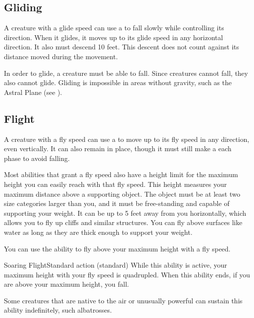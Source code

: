   \subsection{Gliding}\label{Gliding}
    A creature with a glide speed can use a  to fall slowly while controlling its direction.
    When it glides, it moves up to its glide speed in any horizontal direction.
    It also must descend 10 feet.
    This descent does not count against its distance moved during the movement.

    In order to glide, a creature must be able to fall.
    Since  creatures cannot fall, they also cannot glide.
    Gliding is impossible in areas without gravity, such as the Astral Plane (see ).

  \subsection{Flight}\label{Flight}
    A creature with a fly speed can use a  to move up to its fly speed in any direction, even vertically.
    It can also remain in place, though it must still make a  each phase to avoid falling.

     Most abilities that grant a fly speed also have a height limit for the maximum height you can easily reach with that fly speed.
    This height measures your maximum distance above a supporting object.
    The object must be at least two size categories larger than you, and it must be free-standing and capable of supporting your weight.
    It can be up to 5 feet away from you horizontally, which allows you to fly up cliffs and similar structures.
    You can fly above surfaces like water as long as they are thick enough to support your weight.

    You can use the  ability to fly above your maximum height with a fly speed.

    \begin{sustainability}{Soaring Flight}{Standard action}
      \abilitytags \atSustain (standard)
      \rankline
      While this ability is active, your maximum height with your fly speed is quadrupled.
      When this ability ends, if you are above your maximum height, you fall.

      Some creatures that are native to the air or unusually powerful can sustain this ability indefinitely, such albatrosses.
    \end{sustainability}

